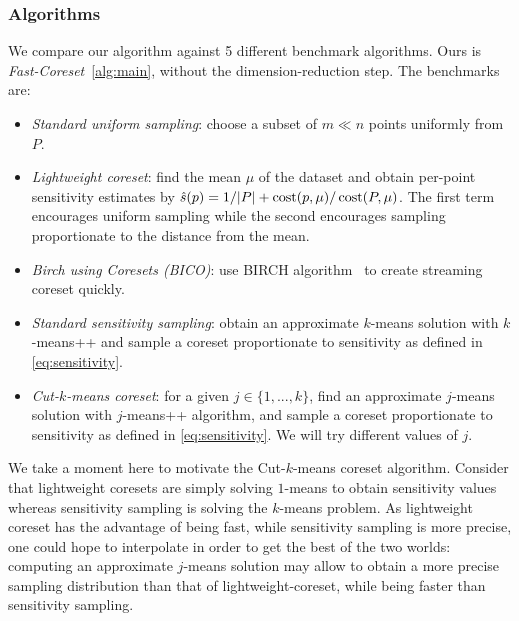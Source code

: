

\subsubsection{Algorithms}
We compare our algorithm against 5 different benchmark algorithms. Ours is \emph{Fast-Coreset}~\ref{alg:main}, without the dimension-reduction step. The benchmarks are:
\begin{itemize}
        \item \emph{Standard uniform sampling}: choose a subset of $m \ll n$ points uniformly from $P$.
        \item \emph{Lightweight coreset}: find the mean $\mu$ of the dataset and obtain per-point sensitivity estimates by $\hat{s}(p) = 1/|P| + \operatorname{cost}(p, \mu) / \operatorname{cost}(P, \mu)$.
            The first term encourages uniform sampling while the second encourages sampling proportionate to the distance from the mean.
        \item \emph{Birch using Coresets (BICO)}: use BIRCH algorithm~\cite{birch} to create streaming coreset quickly. 
        \item \emph{Standard sensitivity sampling}: obtain an approximate $k$-means solution with $k$-means++ and sample a coreset proportionate to sensitivity as defined in \cref{eq:sensitivity}.
        \item \emph{Cut-$k$-means coreset}: for a given $j \in \{1,..., k\}$, find an approximate $j$-means solution with $j$-means++ algorithm, and sample a coreset proportionate to sensitivity as defined in \cref{eq:sensitivity}. We will try different values of $j$. 
\end{itemize}

We take a moment here to motivate the Cut-$k$-means coreset algorithm.  Consider that lightweight coresets are simply solving $1$-means to obtain sensitivity values
whereas sensitivity sampling is solving the $k$-means problem. 
As lightweight coreset has the advantage of being fast, while sensitivity sampling is more precise, one could hope to interpolate in order to get the best of the two worlds: computing an approximate $j$-means solution may allow to obtain a more precise sampling distribution than that of lightweight-coreset, while being faster than sensitivity sampling.

